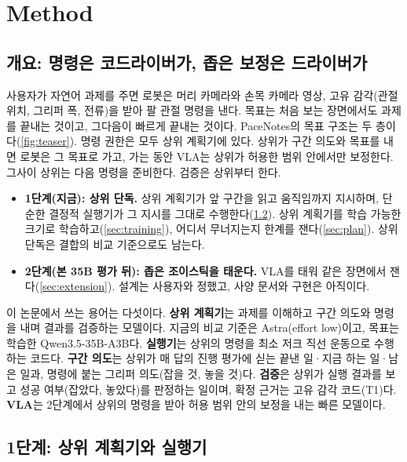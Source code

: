 \section{Method}
\label{sec:method}

\subsection{개요: 명령은 코드라이버가, 좁은 보정은 드라이버가}
\label{sec:overview}
사용자가 자연어 과제를 주면 로봇은 머리 카메라와 손목 카메라 영상, 고유 감각(관절 위치, 그리퍼 폭, 전류)을 받아 팔 관절 명령을 낸다. 목표는 처음 보는 장면에서도 과제를 끝내는 것이고, 그다음이 빠르게 끝내는 것이다. PaceNotes의 목표 구조는 두 층이다(\cref{fig:teaser}). 명령 권한은 모두 상위 계획기에 있다. 상위가 구간 의도와 목표를 내면 로봇은 그 목표로 가고, 가는 동안 VLA는 상위가 허용한 범위 안에서만 보정한다. 그사이 상위는 다음 명령을 준비한다. 검증은 상위부터 한다.
\begin{itemize}
  \item \textbf{1단계(지금): 상위 단독.} 상위 계획기가 앞 구간을 읽고 움직임까지 지시하며, 단순한 결정적 실행기가 그 지시를 그대로 수행한다(\cref{sec:upper}). 상위 계획기를 학습 가능한 크기로 학습하고(\cref{sec:training}), 어디서 무너지는지 한계를 잰다(\cref{sec:plan}). 상위 단독은 결합의 비교 기준으로도 남는다.
  \item \textbf{2단계(본 35B 평가 뒤): 좁은 조이스틱을 태운다.} VLA를 태워 같은 장면에서 잰다(\cref{sec:extension}). 설계는 사용자와 정했고, 사양 문서와 구현은 아직이다.
\end{itemize}
이 논문에서 쓰는 용어는 다섯이다. \textbf{상위 계획기}는 과제를 이해하고 구간 의도와 명령을 내며 결과를 검증하는 모델이다. 지금의 비교 기준은 Astra(effort low)이고, 목표는 학습한 Qwen3.5-35B-A3B다. \textbf{실행기}는 상위의 명령을 최소 저크 직선 운동으로 수행하는 코드다. \textbf{구간 의도}는 상위가 매 답의 진행 평가에 싣는 끝낸 일·지금 하는 일·남은 일과, 명령에 붙는 그리퍼 의도(잡을 것, 놓을 것)다. \textbf{검증}은 상위가 실행 결과를 보고 성공 여부(잡았다, 놓았다)를 판정하는 일이며, 확정 근거는 고유 감각 코드(T1)다. \textbf{VLA}는 2단계에서 상위의 명령을 받아 허용 범위 안의 보정을 내는 빠른 모델이다.

\subsection{1단계: 상위 계획기와 실행기}
\label{sec:upper}
